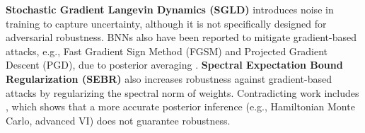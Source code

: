 \documentclass[ %
                    author={Revalda Putawara},
                supervisor={Dr. James Pope},
                    degree={MSc},
                     title={Robustness of Bayesian Neural Networks Design Choices Against Weight and Bias Perturbation Induced by Single Event Upsets (SEUs)},
                      type={},
                      year={2025}]{dissertation}
\begin{document}




\textbf{Stochastic Gradient Langevin Dynamics (SGLD)} \cite{sgld2011} introduces noise in training to capture uncertainty, although it is not specifically designed for adversarial robustness. BNNs also have been reported to mitigate gradient-based attacks, e.g., Fast Gradient Sign Method (FGSM) and Projected Gradient Descent (PGD), due to posterior averaging \cite{carbone2020a}. \textbf{Spectral Expectation Bound Regularization (SEBR)} \cite{sebr2021} also increases robustness against gradient-based attacks by regularizing the spectral norm of weights. Contradicting work includes \cite{Blaas2021}, which shows that a more accurate posterior inference (e.g., Hamiltonian Monte Carlo, advanced VI) does not guarantee robustness.



\end{document}
